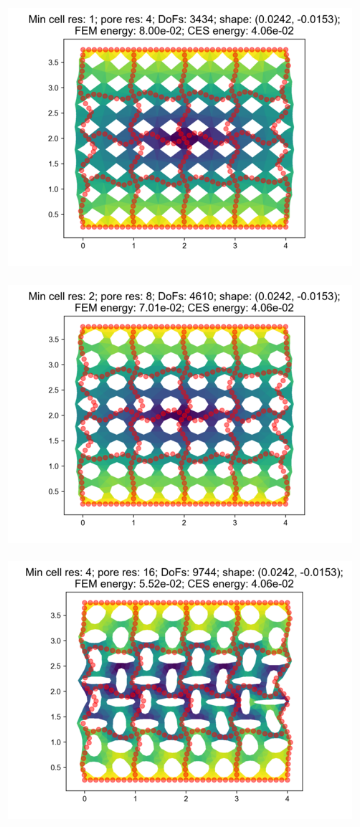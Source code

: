 \begin{figure}[H]
\begin{subfigure}{.45\textwidth}
  \centering
  \includegraphics[width=.8\linewidth]{lces/vis_compression/bm_2_mesh_0.png}
\end{subfigure}
\begin{subfigure}{.45\textwidth}
  \centering
  \includegraphics[width=.8\linewidth]{lces/vis_compression/bm_2_mesh_1.png}
\end{subfigure}
\newline
\begin{subfigure}{.45\textwidth}
  \centering
  \includegraphics[width=.8\linewidth]{lces/vis_compression/bm_2_mesh_2.png}

\end{subfigure}
\end{figure}
